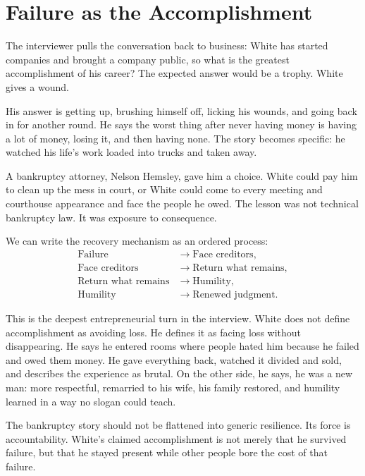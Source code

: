 \section{Failure as the Accomplishment}

The interviewer pulls the conversation back to business: White has started companies and brought a company public, so what is the greatest accomplishment of his career? The expected answer would be a trophy. White gives a wound.

His answer is getting up, brushing himself off, licking his wounds, and going back in for another round. He says the worst thing after never having money is having a lot of money, losing it, and then having none. The story becomes specific: he watched his life's work loaded into trucks and taken away.

A bankruptcy attorney, Nelson Hemsley, gave him a choice. White could pay him to clean up the mess in court, or White could come to every meeting and courthouse appearance and face the people he owed. The lesson was not technical bankruptcy law. It was exposure to consequence.

We can write the recovery mechanism as an ordered process:
\begin{align}
\text{Failure}
&\longrightarrow \text{Face creditors},\\
\text{Face creditors}
&\longrightarrow \text{Return what remains},\\
\text{Return what remains}
&\longrightarrow \text{Humility},\\
\text{Humility}
&\longrightarrow \text{Renewed judgment}.
\end{align}

This is the deepest entrepreneurial turn in the interview. White does not define accomplishment as avoiding loss. He defines it as facing loss without disappearing. He says he entered rooms where people hated him because he failed and owed them money. He gave everything back, watched it divided and sold, and describes the experience as brutal. On the other side, he says, he was a new man: more respectful, remarried to his wife, his family restored, and humility learned in a way no slogan could teach.

\begin{remark}
The bankruptcy story should not be flattened into generic resilience. Its force is accountability. White's claimed accomplishment is not merely that he survived failure, but that he stayed present while other people bore the cost of that failure.
\end{remark}

